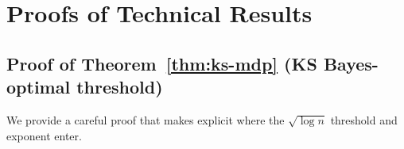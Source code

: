 \documentclass[11pt]{article}
\newcommand{\1}{\mathbf{1}}
\theoremstyle{plain}
\theoremstyle{definition}
\theoremstyle{remark}
\begin{document}
\appendix

\section{Proofs of Technical Results}\label{app:proofs}

\subsection{Proof of Theorem~\ref{thm:ks-mdp} (KS Bayes-optimal threshold)}\label{app:proof-ks-mdp}

We provide a careful proof that makes explicit where the $\sqrt{\log n}$ threshold and exponent enter.
\end{document}
